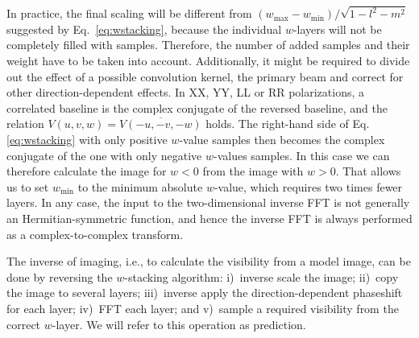 \documentclass[useAMS,usenatbib]{mn2e}
\begin{document}
In practice, the final scaling will be different from $\left(w_{\max} - w_{\min}\right)/\sqrt{1-l^2-m^2}$ suggested by Eq.~\eqref{eq:wstacking}, because the individual $w$-layers will not be completely filled with samples. Therefore, the number of added samples and their weight have to be taken into account. Additionally, it might be required to divide out the effect of a possible convolution kernel, the primary beam and correct for other direction-dependent effects. In XX, YY, LL or RR polarizations, a correlated baseline is the complex conjugate of the reversed baseline, and the relation $V(u,v,w)=\overline{V(-u,-v,-w)}$ holds. The right-hand side of Eq.\eqref{eq:wstacking} with only positive $w$-value samples then becomes the complex conjugate of the one with only negative $w$-values samples. In this case we can therefore calculate the image for $w<0$ from the image with $w>0$. That allows us to set $w_{\min}$ to the minimum absolute $w$-value, which requires two times fewer layers. In any case, the input to the two-dimensional inverse FFT is not generally an Hermitian-symmetric function, and hence the inverse FFT is always performed as a complex-to-complex transform. 

The inverse of imaging, i.e., to calculate the visibility from a model image, can be done by reversing the $w$-stacking algorithm: i)~inverse scale the image; ii)~copy the image to several layers; iii)~inverse apply the direction-dependent phaseshift for each layer; iv)~FFT each layer; and v)~sample a required visibility from the correct $w$-layer. We will refer to this operation as prediction.
\end{document}
